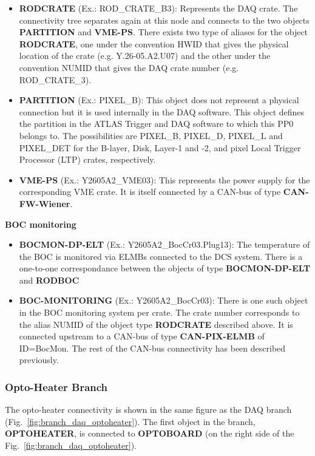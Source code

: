 \begin{itemize}
\item {\bf RODCRATE} (Ex.: ROD\_CRATE\_B3): Represents the DAQ crate. The connectivity tree separates
again at this node and connects to the two objects {\bf PARTITION} and {\bf VME-PS}. There
exists two type of aliases for the object {\bf RODCRATE}, one under the convention
HWID that gives the physical location of the crate (e.g. Y.26-05.A2.U07) and the other under
the convention NUMID that gives the DAQ crate number (e.g. ROD\_CRATE\_3).
\item {\bf PARTITION} (Ex.: PIXEL\_B): This object does not represent a physical connection but it is 
used internally in the DAQ software. This object defines the partition in the ATLAS Trigger
and DAQ software to which this PP0 belongs to. The possibilities are PIXEL\_B, PIXEL\_D,
PIXEL\_L and PIXEL\_DET for the B-layer, Disk, Layer-1 and -2, and pixel Local Trigger
Processor (LTP) crates, respectively.
\item {\bf VME-PS} (Ex.: Y2605A2\_VME03): This represents the power supply for the corresponding 
VME crate. It is itself connected by a CAN-bus of type {\bf CAN-FW-Wiener}.
\end{itemize}

\noindent \hspace{0.2cm} {\bf \normalsize BOC monitoring}

\begin{itemize}
\item {\bf BOCMON-DP-ELT} (Ex.: Y2605A2\_BocCr03.Plug13): The temperature of the BOC is monitored
via ELMBs connected to the DCS system. There is a one-to-one correspondance
between the objects of type {\bf BOCMON-DP-ELT} and {\bf RODBOC}
\item {\bf BOC-MONITORING} (Ex.: Y2605A2\_BocCr03): There is one such object in the BOC monitoring
system per crate. The crate number corresponds to the alias NUMID of the object type {\bf RODCRATE} 
described above. It is connected upstream to a CAN-bus of type {\bf CAN-PIX-ELMB} of ID=BocMon. 
The rest of the CAN-bus connectivity has been described previously.
\end{itemize}


\subsubsection{Opto-Heater Branch}
\label{sec:optoheater}

The opto-heater connectivity is shown in the same figure as the DAQ branch
(Fig.~\ref{fig:branch_daq_optoheater}). The first object in the branch, 
{\bf OPTOHEATER}, is connected to {\bf OPTOBOARD} (on the right side of the Fig.~\ref{fig:branch_daq_optoheater}).

